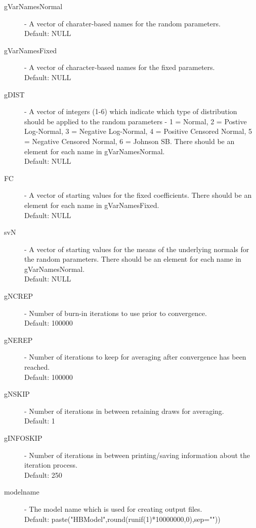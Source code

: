 \documentclass{article}\usepackage[]{graphicx}\usepackage[]{color}
\begin{document}
\begin{description}

\item[gVarNamesNormal] - A vector of charater-based names for the random parameters. \\
Default: NULL

\item[gVarNamesFixed] - A vector of character-based names for the fixed parameters.\\
Default: NULL

\item[gDIST] -  A vector of integers (1-6) which indicate which type of distribution should be applied to the random parameters - 1 = Normal, 2 = Postive Log-Normal, 3 = Negative Log-Normal, 4 = Positive Censored Normal, 5 = Negative Censored Normal, 6 = Johnson SB. There should be an element for each name in gVarNamesNormal. \\ Default: NULL

\item[FC] - A vector of starting values for the fixed coefficients. There should be an element for each name in gVarNamesFixed.\\ 
Default: NULL

\item[svN] - A vector of starting values for the means of the underlying normals for the random parameters. There should be an element for each name in gVarNamesNormal.\\ Default: NULL

\item[gNCREP] - Number of burn-in iterations to use prior to convergence.\\ 
Default: 100000

\item[gNEREP] - Number of iterations to keep for averaging after convergence has been reached.\\ Default: 100000

\item[gNSKIP] - Number of iterations in between retaining draws for averaging.\\ 
Default: 1

\item[gINFOSKIP] - Number of iterations in between printing/saving information about the iteration process.
\\ Default: 250

\item[modelname] - The model name which is used for creating output files. 
\\ Default: paste("HBModel",round(runif(1)*10000000,0),sep=""))


\end{description}
\end{document}
